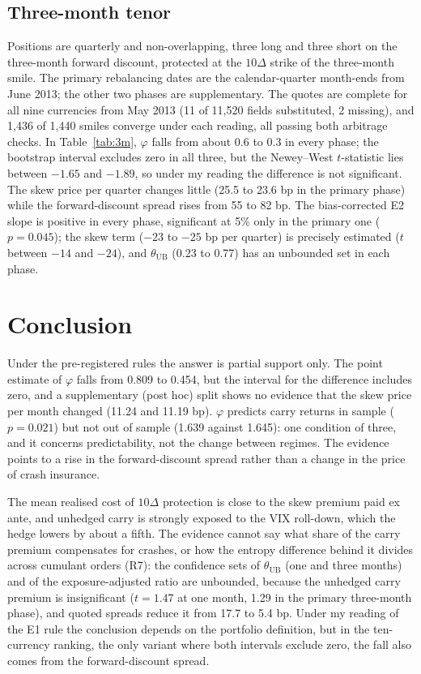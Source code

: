 \documentclass[11pt]{article}
\theoremstyle{result}
\newcommand{\thUB}{\theta_{\mathrm{UB}}}
\newcommand{\D}{\Delta}
\begin{document}
\subsection{Three-month tenor}

Positions are quarterly and non-overlapping, three long and three short on the three-month forward discount, protected at the $10\D$ strike of the three-month smile. The primary rebalancing dates are the calendar-quarter month-ends from June 2013; the other two phases are supplementary. The quotes are complete for all nine currencies from May 2013 (11 of 11,520 fields substituted, 2 missing), and 1,436 of 1,440 smiles converge under each reading, all passing both arbitrage checks. In Table~\ref{tab:3m}, $\varphi$ falls from about 0.6 to 0.3 in every phase; the bootstrap interval excludes zero in all three, but the Newey--West $t$-statistic lies between $-1.65$ and $-1.89$, so under my reading the difference is not significant. The skew price per quarter changes little (25.5 to 23.6 bp in the primary phase) while the forward-discount spread rises from 55 to 82 bp. The bias-corrected E2 slope is positive in every phase, significant at 5\% only in the primary one ($p=0.045$); the skew term ($-23$ to $-25$ bp per quarter) is precisely estimated ($t$ between $-14$ and $-24$), and $\thUB$ (0.23 to 0.77) has an unbounded set in each phase.

\section{Conclusion}\label{sec:concl}

Under the pre-registered rules the answer is partial support only. The point estimate of $\varphi$ falls from 0.809 to 0.454, but the interval for the difference includes zero, and a supplementary (post hoc) split shows no evidence that the skew price per month changed (11.24 and 11.19 bp). $\varphi$ predicts carry returns in sample ($p=0.021$) but not out of sample (1.639 against 1.645): one condition of three, and it concerns predictability, not the change between regimes. The evidence points to a rise in the forward-discount spread rather than a change in the price of crash insurance.

The mean realised cost of $10\D$ protection is close to the skew premium paid ex ante, and unhedged carry is strongly exposed to the VIX roll-down, which the hedge lowers by about a fifth. The evidence cannot say what share of the carry premium compensates for crashes, or how the entropy difference behind it divides across cumulant orders (R7): the confidence sets of $\thUB$ (one and three months) and of the exposure-adjusted ratio are unbounded, because the unhedged carry premium is insignificant ($t=1.47$ at one month, 1.29 in the primary three-month phase), and quoted spreads reduce it from 17.7 to 5.4 bp. Under my reading of the E1 rule the conclusion depends on the portfolio definition, but in the ten-currency ranking, the only variant where both intervals exclude zero, the fall also comes from the forward-discount spread.
\end{document}
